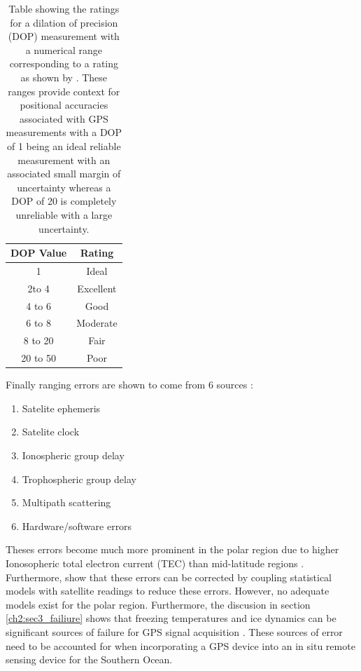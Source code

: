 \begin{table}[H]
	\centering
	\caption{Table showing the ratings for a dilation of precision (DOP) measurement with a numerical range corresponding to a rating as shown by \textcite{tahsin2015analysis}. These ranges provide context for positional accuracies associated with GPS measurements with a DOP of 1 being an ideal reliable measurement with an associated small margin of uncertainty whereas a DOP of 20 is completely unreliable with a large uncertainty. }
	\label{tab:gps_DOP}
	\begin{tabular}{|c|c|}
		\hline
		 DOP Value & Rating \\
		\hline
	 1 & Ideal \\
		\hline
	 2to 4 & Excellent \\
		\hline
	 4 to 6 & Good \\
		\hline
		6 to 8 & Moderate \\
		\hline
		8 to 20 & Fair \\
		\hline
20 to 50 & Poor \\
		\hline
	\end{tabular}
\end{table}

Finally ranging errors are shown to come from 6 sources \cite{spilker1996global}:
\begin{enumerate}
	\item Satelite ephemeris
	\item Satelite clock
	\item Ionospheric group delay
	\item Trophospheric group delay
	\item Multipath scattering
	\item Hardware/software errors
\end{enumerate}

Theses errors become much more prominent in the polar region due to higher Ionosopheric total electron current (TEC) than mid-latitude regions \cite{bishop1990ranging}. Furthermore, \textcite{bishop1990ranging} show that these errors can be corrected by coupling statistical models with satellite readings to reduce these errors. However, no adequate models exist for the polar region. Furthermore, the discusion in section \ref{ch2:sec3_failiure} shows that freezing temperatures and ice dynamics can be significant sources of failure for GPS signal acquisition \cite{doble2017robust}. These sources of error need to be accounted for when incorporating a GPS device into an in situ remote sensing device for the Southern Ocean.
